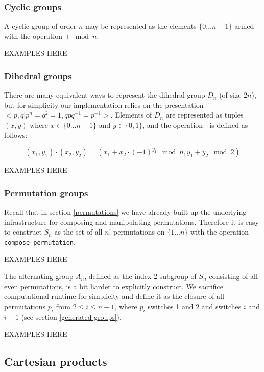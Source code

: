 \documentclass{article}
\begin{document}
        \subsubsection{Cyclic groups}
        
        A cyclic group of order $n$ may be represented as the elements $\{0 \ldots n-1\}$ armed with the operation $+ \mod n$.
        
                 EXAMPLES HERE
        
        \subsubsection{Dihedral groups}
        
        There are many equivalent ways to represent the dihedral group $D_n$ (of size $2n$), but for simplicity our implementation relies on the presentation $<p,q|p^n = q^2 = 1, qpq^{-1} = p^{-1}>$. Elements of $D_n$ are represented as tuples $(x,y)$ where $x \in \{ 0 \ldots n-1\}$ and $y \in \{0, 1\}$, and the operation $\cdot$ is defined as follows:
        
        $$(x_1,y_1) \cdot (x_2,y_2) = (x_1 + x_2 \cdot (-1)^{y_1} \mod n, y_1 + y_2 \mod 2)$$
        
                 EXAMPLES HERE
        
        \subsubsection{Permutation groups}
        
        Recall that in section \ref{permutations} we have already built up the underlying infrastructure for composing and manipulating permutations. Therefore it is easy to construct $S_n$ as the set of all $n!$ permutations on $\{1\ldots n\}$ with the operation \texttt{compose-permutation}.
        
                 EXAMPLES HERE
        
		The alternating group $A_n$, defined as the index-2 subgroup of $S_n$ consisting of all even permutations, is a bit harder to explicitly construct. We sacrifice computational runtime for simplicity and define it as the closure of all permutations $p_i$ from $2\leq i \leq n-1$, where $p_i$ switches 1 and 2 and switches $i$ and $i+1$ (see section \ref{generated-groups}).
		
		         EXAMPLES HERE
    
    	\subsection{Cartesian products}
	
\end{document}
